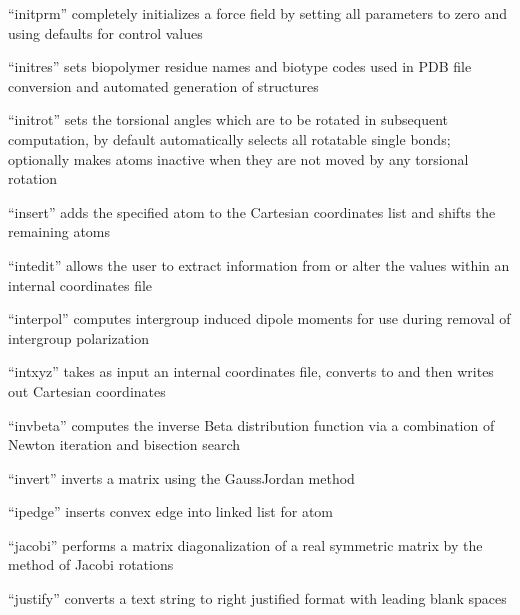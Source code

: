 \documentclass[letterpaper,11pt,english]{sphinxmanual}
\begin{document}
“initprm” completely initializes a force field by setting all
parameters to zero and using defaults for control values


“initres” sets biopolymer residue names and biotype codes used
in PDB file conversion and automated generation of structures


“initrot” sets the torsional angles which are to be rotated
in subsequent computation, by default automatically selects
all rotatable single bonds; optionally makes atoms inactive
when they are not moved by any torsional rotation


“insert” adds the specified atom to the Cartesian
coordinates list and shifts the remaining atoms


“intedit” allows the user to extract information from
or alter the values within an internal coordinates file


“interpol” computes intergroup induced dipole moments for use
during removal of intergroup polarization


“intxyz” takes as input an internal coordinates file,
converts to and then writes out Cartesian coordinates


“invbeta” computes the inverse Beta distribution function
via a combination of Newton iteration and bisection search


“invert” inverts a matrix using the Gauss\sphinxhyphen{}Jordan method


“ipedge” inserts convex edge into linked list for atom


“jacobi” performs a matrix diagonalization of a real
symmetric matrix by the method of Jacobi rotations


“justify” converts a text string to right justified format
with leading blank spaces
\end{document}
